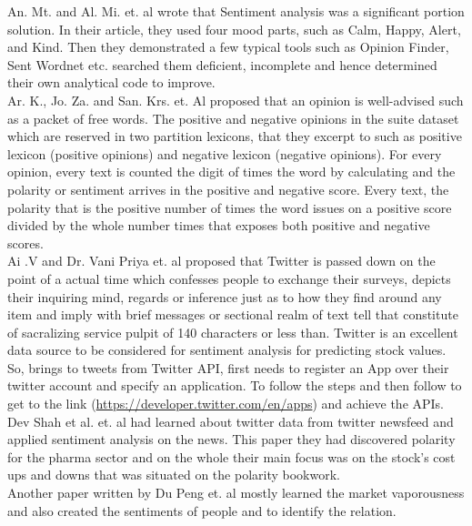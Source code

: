 An. Mt. and Al. Mi. \cite{bhandari2017stock} et. al wrote that Sentiment analysis was a significant portion solution. In their article, they used four mood parts, such as Calm, Happy, Alert, and Kind. Then they demonstrated a few typical tools such as Opinion Finder, Sent Wordnet etc. searched them deficient, incomplete and hence determined their own analytical code to improve.\\

Ar. K., Jo. Za. and San. Krs. \cite{mittal2012stock} et. Al proposed that an opinion is well-advised such as a packet of free words. The positive and negative opinions in the suite dataset which are reserved in two partition lexicons, that they excerpt to such as positive lexicon (positive opinions) and negative lexicon (negative opinions). For every opinion, every text is counted the digit of times the word by calculating and the polarity or sentiment arrives in the positive and negative score. Every text, the polarity that is the positive number of times the word issues on a positive score divided by the whole number times that exposes both positive and negative scores.\\

Ai .V and Dr. Vani Priya \cite{krishna2013polarity} et. al proposed that Twitter is passed down on the point of a actual time which confesses people to exchange their surveys, depicts their inquiring mind, regards or inference just as to how they find around any item and imply with brief messages or sectional realm of text tell that constitute of sacralizing service pulpit of 140 characters or less than. Twitter is an excellent data source to be considered for sentiment analysis for predicting stock values. So, brings to tweets from Twitter API, first needs to register an App over their twitter account and specify an application. To follow the steps and then follow to get to the link (\href{https://developer.twitter.com/en/apps}{https://developer.twitter.com/en/apps}) and achieve the APIs. Dev Shah et al. \cite{nemes2021prediction} et. al had learned about twitter data from twitter newsfeed and applied sentiment analysis on the news. This paper they had discovered polarity for the pharma sector and on the whole their main focus was on the stock's cost ups and downs that was situated on the polarity bookwork.\\

Another paper written by Du Peng \cite{shah2018predicting} et. al mostly learned the market vaporousness and also created the sentiments of people and to identify the relation. \\

